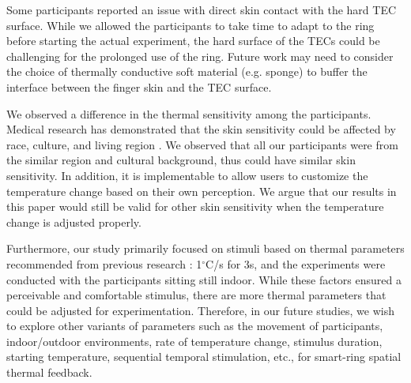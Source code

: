\documentclass[preprint,12pt]{elsarticle}
\begin{document}
Some participants reported an issue with direct skin contact with the hard TEC surface. While we allowed the participants to take time to adapt to the ring before starting the actual experiment, the hard surface of the TECs could be challenging for the prolonged use of the ring. Future work may need to consider the choice of thermally conductive soft material (e.g. sponge) to buffer the interface between the finger skin and the TEC surface.

We observed a difference in the thermal sensitivity among the participants. Medical research has demonstrated that the skin sensitivity could be affected by race, culture, and living region \cite{17}. We observed that all our participants were from the similar region and cultural background, thus could have similar skin sensitivity. In addition, it is implementable to allow users to customize the temperature change based on their own perception. We argue that our results in this paper would still be valid for other skin sensitivity when the temperature change is adjusted properly.

Furthermore, our study primarily focused on stimuli based on thermal parameters recommended from previous research \cite{42}: 1$^{\circ}$C/s for 3s, and the experiments were conducted with the participants sitting still indoor. While these factors ensured a perceivable and comfortable stimulus, there are more thermal parameters that could be adjusted for experimentation. Therefore, in our future studies, we wish to explore other variants of parameters such as the movement of participants, indoor/outdoor environments, rate of temperature change, stimulus duration, starting temperature, sequential temporal stimulation, etc., for smart-ring spatial thermal feedback.
\end{document}
